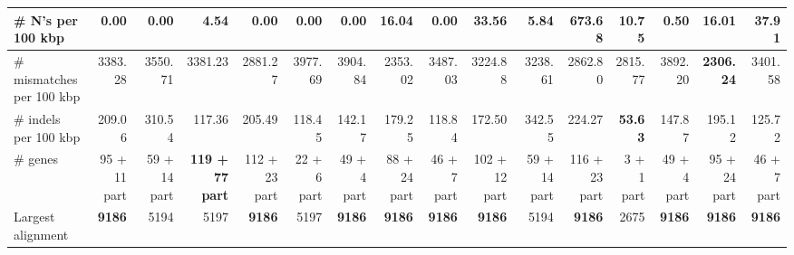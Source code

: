 \documentclass[12pt,a4paper]{article}
\begin{document}
\begin{table}[ht]
\begin{center}
\begin{tabular}{|l*{15}{|r}|}
\# N's per 100 kbp & {\bf 0.00} & {\bf 0.00} & 4.54 & {\bf 0.00} & {\bf 0.00} & {\bf 0.00} & 16.04 & {\bf 0.00} & 33.56 & 5.84 & 673.68 & 10.75 & 0.50 & 16.01 & 37.91 \\ \hline
\# mismatches per 100 kbp & 3383.28 & 3550.71 & 3381.23 & 2881.27 & 3977.69 & 3904.84 & 2353.02 & 3487.03 & 3224.88 & 3238.61 & 2862.80 & 2815.77 & 3892.20 & {\bf 2306.24} & 3401.58 \\ \hline
\# indels per 100 kbp & 209.06 & 310.54 & 117.36 & 205.49 & 118.45 & 142.17 & 179.25 & 118.84 & 172.50 & 342.55 & 224.27 & {\bf 53.63} & 147.87 & 195.12 & 125.72 \\ \hline
\# genes & 95 + 11 part & 59 + 14 part & {\bf 119 + 77 part} & 112 + 23 part & 22 + 6 part & 49 + 4 part & 88 + 24 part & 46 + 7 part & 102 + 12 part & 59 + 14 part & 116 + 23 part & 3 + 1 part & 49 + 4 part & 95 + 24 part & 46 + 7 part \\ \hline
Largest alignment & {\bf 9186} & 5194 & 5197 & {\bf 9186} & 5197 & {\bf 9186} & {\bf 9186} & {\bf 9186} & {\bf 9186} & 5194 & {\bf 9186} & 2675 & {\bf 9186} & {\bf 9186} & {\bf 9186} \\ \hline
\end{tabular}
\end{center}
\end{table}
\end{document}
